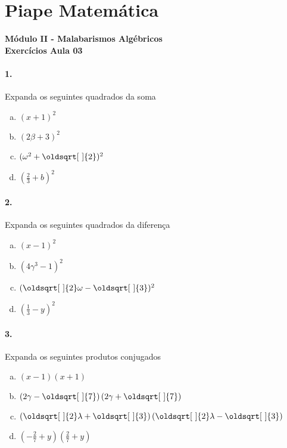 \documentclass[a4paper,12pt]{article}
\renewcommand*{\sqrt}[2][\ ]{\oldsqrt[#1]{#2}}
\begin{document}
 
  
\section*{Piape Matemática} 
\textbf{Módulo II - Malabarismos Algébricos}\\
\textbf{Exercícios Aula 03}         
\begin{multicols}{2}
\paragraph{1.} Expanda os seguintes quadrados da soma
\begin{enumerate}[a)]
\item $(x + 1)^2$
\item $(2\beta + 3)^2$
\item $(\omega^2 + \sqrt{2})^2$
\item $\displaystyle\left(\frac{2}{3} + b\right)^2$
\end{enumerate} 

\paragraph{2.} Expanda os seguintes quadrados da diferença
\begin{enumerate}[a)]
\item $(x - 1)^2$
\item $(4\gamma^3 - 1)^2$
\item $(\sqrt{2}\omega - \sqrt{3})^2$
\item $\displaystyle\left(\frac{1}{3} - y\right)^2$
\end{enumerate} 

\paragraph{3.} Expanda os seguintes produtos conjugados
\begin{enumerate}[a)]
\item $(x - 1)(x + 1)$
\item $\left(2\gamma - \sqrt{7}\right)\left(2\gamma + \sqrt{7}\right)$
\item $\left(\sqrt{2}\lambda + \sqrt{3}\right)\left(\sqrt{2}\lambda - \sqrt{3}\right)$
\item $\displaystyle\left(-\frac{2}{7} + y\right)\left(\frac{2}{7} + y\right)$
\end{enumerate}  

\end{multicols}
\end{document}
